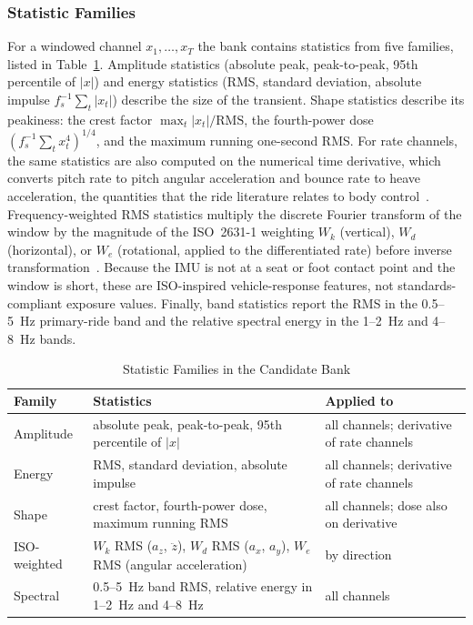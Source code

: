 \documentclass[lettersize,journal]{IEEEtran}
\begin{document}
\subsubsection{Statistic Families}
For a windowed channel $x_1,\ldots,x_T$ the bank contains statistics from five families, listed in Table~\ref{tab:bank}. Amplitude statistics (absolute peak, peak-to-peak, 95th percentile of $|x|$) and energy statistics (RMS, standard deviation, absolute impulse $f_s^{-1}\sum_t|x_t|$) describe the size of the transient. Shape statistics describe its peakiness: the crest factor $\max_t|x_t|/\mathrm{RMS}$, the fourth-power dose $(f_s^{-1}\sum_t x_t^4)^{1/4}$, and the maximum running one-second RMS. For rate channels, the same statistics are also computed on the numerical time derivative, which converts pitch rate to pitch angular acceleration and bounce rate to heave acceleration, the quantities that the ride literature relates to body control~\cite{guastadisegni2024ride}. Frequency-weighted RMS statistics multiply the discrete Fourier transform of the window by the magnitude of the ISO~2631-1 weighting $W_k$ (vertical), $W_d$ (horizontal), or $W_e$ (rotational, applied to the differentiated rate) before inverse transformation~\cite{iso2631}. Because the IMU is not at a seat or foot contact point and the window is short, these are ISO-inspired vehicle-response features, not standards-compliant exposure values. Finally, band statistics report the RMS in the 0.5--5~Hz primary-ride band and the relative spectral energy in the 1--2~Hz and 4--8~Hz bands.

\begin{table}[t]
\caption{Statistic Families in the Candidate Bank}
\label{tab:bank}
\centering
\setlength{\tabcolsep}{3pt}
\begin{tabular}{p{}p{}p{}}
\toprule
Family & Statistics & Applied to \\
\midrule
Amplitude & absolute peak, peak-to-peak, 95th percentile of $|x|$ & all channels; derivative of rate channels \\
Energy & RMS, standard deviation, absolute impulse & all channels; derivative of rate channels \\
Shape & crest factor, fourth-power dose, maximum running RMS & all channels; dose also on derivative \\
ISO-weighted & $W_k$ RMS ($a_z$, $\ddot z$), $W_d$ RMS ($a_x$, $a_y$), $W_e$ RMS (angular acceleration) & by direction \\
Spectral & 0.5--5~Hz band RMS, relative energy in 1--2~Hz and 4--8~Hz & all channels \\
\bottomrule
\end{tabular}
\end{table}
\end{document}
